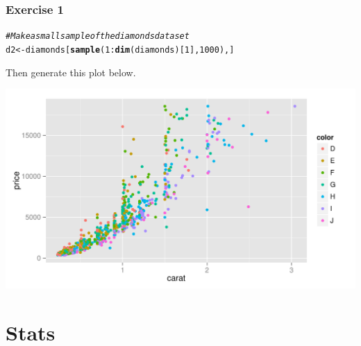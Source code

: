 \documentclass{beamer}\usepackage[]{graphicx}\usepackage[]{color}
\makeatletter
\newcommand{\hlnum}[1]{\textcolor[rgb]{0.686,0.059,0.569}{#1}}%
\newcommand{\hlcom}[1]{\textcolor[rgb]{0.678,0.584,0.686}{\textit{#1}}}%
\newcommand{\hlopt}[1]{\textcolor[rgb]{0,0,0}{#1}}%
\newcommand{\hlstd}[1]{\textcolor[rgb]{0.345,0.345,0.345}{#1}}%
\newcommand{\hlkwb}[1]{\textcolor[rgb]{0.69,0.353,0.396}{#1}}%
\newcommand{\hlkwd}[1]{\textcolor[rgb]{0.737,0.353,0.396}{\textbf{#1}}}%
\newenvironment{kframe}{%
 \def\at@end@of@kframe{}%
 \ifinner\ifhmode%
  \def\at@end@of@kframe{\end{minipage}}%
  \begin{minipage}{\columnwidth}%
 \fi\fi%
 \def\FrameCommand##1{\hskip\@totalleftmargin \hskip-\fboxsep
 \colorbox{shadecolor}{##1}\hskip-\fboxsep
     \hskip-\linewidth \hskip-\@totalleftmargin \hskip\columnwidth}%
 \MakeFramed {\advance\hsize-\width
   \@totalleftmargin\z@ \linewidth\hsize
   \@setminipage}}%
 {\par\unskip\endMakeFramed%
 \at@end@of@kframe}
\newenvironment{knitrout}{}{} %
\makeatother
\begin{document}
\begin{frame}[fragile]
\frametitle{Exercise 1}
\begin{knitrout}\footnotesize
{}\color{fgcolor}\begin{kframe}
\begin{alltt}
\hlcom{# Make a small sample of the diamonds dataset}
\hlstd{d2} \hlkwb{<-} \hlstd{diamonds[}\hlkwd{sample}\hlstd{(}\hlnum{1}\hlopt{:}\hlkwd{dim}\hlstd{(diamonds)[}\hlnum{1}\hlstd{],} \hlnum{1000}\hlstd{), ]}
\end{alltt}
\end{kframe}
\end{knitrout}
Then generate this plot below.

\begin{knitrout}\footnotesize
{}\color{fgcolor}

{\centering \includegraphics[width=.75\linewidth]{figure/ex1} 

}



\end{knitrout}
\end{frame}


\section*{Stats}
\frame{\sectionpage}

\end{document}

